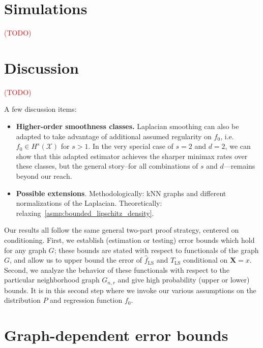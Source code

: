 \documentclass{article}
\newcommand{\1}{\mathbf{1}}
\newcommand{\Xset}{\mathcal{X}}
\newcommand{\mc}[1]{\mathcal{#1}}
\newcommand{\wh}[1]{\widehat{#1}}
\newcommand{\LS}{\mathrm{LS}}
\theoremstyle{alden}
\theoremstyle{aldenthm}
\theoremstyle{definition}
\theoremstyle{remark}
\begin{document}
\section{Simulations}
\label{sec:simulations}

\textcolor{red}{(TODO)}

\section{Discussion}
\label{sec:discussion}

\textcolor{red}{(TODO)}

A few discussion items:
\begin{itemize}
	\item \textbf{Higher-order smoothness classes.} Laplacian smoothing can also be adapted to take advantage of additional assumed regularity on $f_0$, i.e. $f_0 \in H^s(\mc{\Xset})$ for $s > 1$. In the very special case of $s = 2$ and $d = 2$, we can show that this adapted estimator achieves the sharper minimax rates over these classes, but the general story--for all combinations of $s$ and $d$---remains beyond our reach.
	\item \textbf{Possible extensions}. Methodologically: kNN graphs and different normalizations of the Laplacian. Theoretically: relaxing~\ref{asmp:bounded_lipschitz_density}. 
\end{itemize}

\clearpage

\appendix

\clearpage

Our results all follow the same general two-part proof strategy, centered on conditioning. First, we establish (estimation or testing) error bounds which hold for any graph $G$; these bounds are stated with respect to functionals of the graph $G$, and allow us to upper bound the error of $\wh{f}_{\LS}$ and $T_{\LS}$ conditional on $\mathbf{X} = x$. Second, we analyze the behavior of these functionals with respect to the particular neighborhood graph $G_{n,r}$ and give high probability (upper or lower) bounds. It is in this second step where we invoke our various assumptions on the distribution $P$ and regression function $f_0$.

\section{Graph-dependent error bounds}
\label{sec:fixed_graph_error_bounds}
\end{document}
